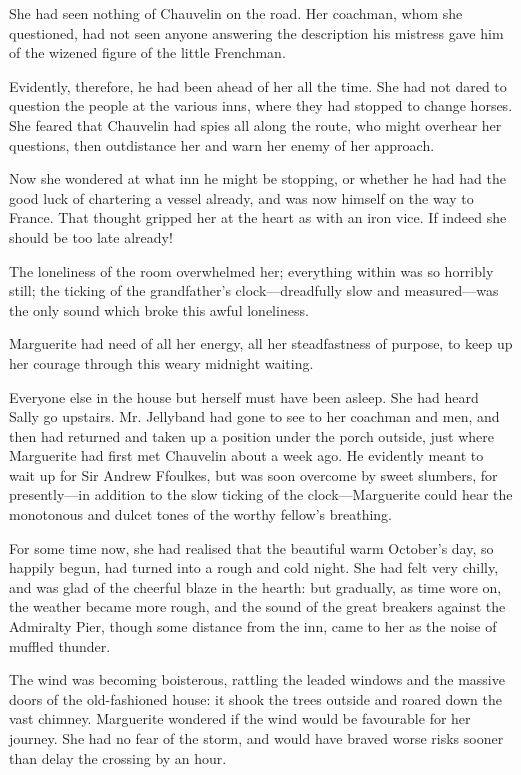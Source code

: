 \documentclass[paper=5.5in:8.5in,BCOR=7mm,twoside,DIV=calc,12pt,usegeometry,chapterprefix,endperiod,headings=big]{scrbook}
\begin{document}
She had seen nothing of Chauvelin on the road. Her coachman, whom she questioned, had not seen anyone answering the description his mistress gave him of the wizened figure of the little Frenchman.

Evidently, therefore, he had been ahead of her all the time. She had not dared to question the people at the various inns, where they had stopped to change horses. She feared that Chauvelin had spies all along the route, who might overhear her questions, then outdistance her and warn her enemy of her approach.

Now she wondered at what inn he might be stopping, or whether he had had the good luck of chartering a vessel already, and was now himself on the way to France. That thought gripped her at the heart as with an iron vice. If indeed she should be too late already!

The loneliness of the room overwhelmed her; everything within was so horribly still; the ticking of the grandfather's clock---dreadfully slow and measured---was the only sound which broke this awful loneliness.

Marguerite had need of all her energy, all her steadfastness of purpose, to keep up her courage through this weary midnight waiting.

Everyone else in the house but herself must have been asleep. She had heard Sally go upstairs. Mr. Jellyband had gone to see to her coachman and men, and then had returned and taken up a position under the porch outside, just where Marguerite had first met Chauvelin about a week ago. He evidently meant to wait up for Sir Andrew Ffoulkes, but was soon overcome by sweet slumbers, for presently---in addition to the slow ticking of the clock---Marguerite could hear the monotonous and dulcet tones of the worthy fellow's breathing.

For some time now, she had realised that the beautiful warm October's day, so happily begun, had turned into a rough and cold night. She had felt very chilly, and was glad of the cheerful blaze in the hearth: but gradually, as time wore on, the weather became more rough, and the sound of the great breakers against the Admiralty Pier, though some distance from the inn, came to her as the noise of muffled thunder.

The wind was becoming boisterous, rattling the leaded windows and the massive doors of the old-fashioned house: it shook the trees outside and roared down the vast chimney. Marguerite wondered if the wind would be favourable for her journey. She had no fear of the storm, and would have braved worse risks sooner than delay the crossing by an hour.
\end{document}
